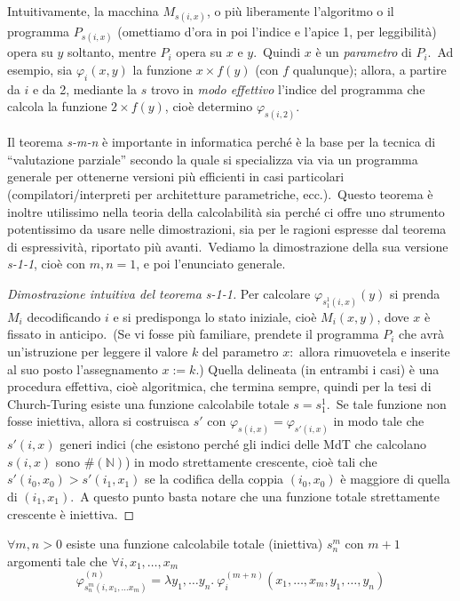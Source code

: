 \noindent Intuitivamente, la macchina $M_{s(i,x)}$, o più liberamente l'algoritmo o il programma $P_{s(i,x)}$ (omettiamo d'ora in poi l'indice e l'apice 1, per leggibilità) opera su $y$ soltanto, mentre $P_i$ opera su $x$ e $y$.\
Quindi $x$ è un \textit{parametro} di $P_i$.\
Ad esempio, sia $\varphi_i(x,y)$ la funzione $x \times f(y)$ (con $f$ qualunque); allora, a partire da $i$ e da 2, mediante la $s$ trovo in \textit{modo effettivo} l'indice del programma che calcola la funzione $2 \times f(y)$, cioè determino $\varphi_{s(i,2)}$.\

Il teorema \textit{s-m-n} è importante in informatica perché è la base per la tecnica di ``valutazione parziale'' secondo la quale si specializza via via un programma generale per ottenerne versioni più eﬃcienti in casi particolari (compilatori/interpreti per architetture parametriche, ecc.).\
Questo teorema è inoltre utilissimo nella teoria della calcolabilità sia perché ci offre uno strumento potentissimo da usare nelle dimostrazioni, sia per le ragioni espresse dal teorema di espressività, riportato più avanti.\
Vediamo la dimostrazione della sua versione \textit{s-1-1}, cioè con $m, n = 1$, e poi l'enunciato generale.

\begin{proof}[Dimostrazione intuitiva del teorema s-1-1]
    Per calcolare $\varphi_{s_1^1(i,x)}(y)$ si prenda $M_i$ decodificando $i$ e si predisponga lo stato iniziale, cioè $M_i(x, y)$, dove $x$ è fissato in anticipo.\
    (Se vi fosse più familiare, prendete il programma $P_i$ che avrà un'istruzione per leggere il valore $k$ del parametro $x$:\ allora rimuovetela e inserite al suo posto l'assegnamento $x := k$.)
    Quella delineata (in entrambi i casi) è una procedura effettiva, cioè algoritmica, che termina sempre, quindi per la tesi di Church-Turing esiste una funzione calcolabile totale $s = s_1^1$.\
    Se tale funzione non fosse iniettiva, allora si costruisca $s'$ con $\varphi_{s(i,x)} = \varphi_{s'(i,x)}$ in modo tale che $s'(i, x)$ generi indici (che esistono perché gli indici delle MdT che calcolano $s(i, x)$ sono $\#(\mathbb{N})$) in modo strettamente crescente, cioè tali che $s'(i_0, x_0 ) > s'(i_1, x_1)$ se la codifica della coppia $(i_0, x_0)$ è maggiore di quella di $(i_1, x_1)$.\
    A questo punto basta notare che una funzione totale strettamente crescente è iniettiva.
\end{proof}

\begin{theorem}[Parametro, s-m-n]
    \label{parametro}
    $\forall m,n > 0$ esiste una funzione calcolabile totale (iniettiva) $s_n^m$ con $m+1$ argomenti tale che $\forall i, x_1, \dots, x_m$
    \[\varphi_{s_n^m(i, x_1,\dots x_m)}^{(n)} = \lambda y_1, \dots y_n.\ \varphi_i^{(m+n)}(x_1,\dots, x_m, y_1, \dots, y_n)\]
\end{theorem}

